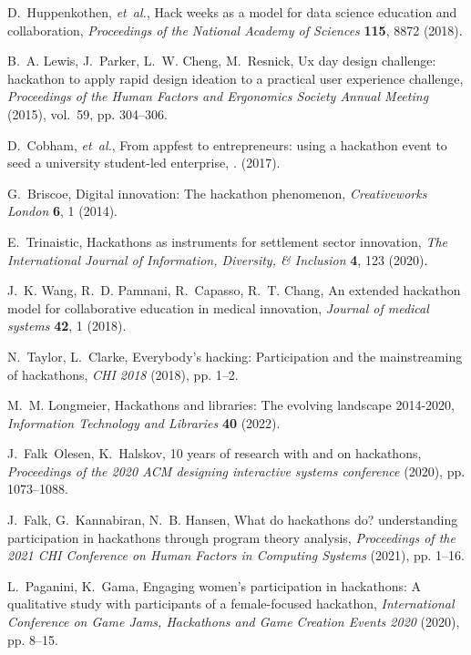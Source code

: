 \documentclass{ieeeaccess}
\begin{document}
\begin{thebibliography}{10}

D.~Huppenkothen, {\it et~al.\/}, Hack weeks as a model for data science
  education and collaboration, {\it Proceedings of the National Academy of
  Sciences\/} {\bf 115}, 8872 (2018).

B.~A. Lewis, J.~Parker, L.~W. Cheng, M.~Resnick, Ux day design challenge:
  hackathon to apply rapid design ideation to a practical user experience
  challenge, {\it Proceedings of the Human Factors and Ergonomics Society
  Annual Meeting\/} (2015), vol.~59, pp. 304--306.

D.~Cobham, {\it et~al.\/}, From appfest to entrepreneurs: using a hackathon
  event to seed a university student-led enterprise, {\it .\/}  (2017).

G.~Briscoe, Digital innovation: The hackathon phenomenon, {\it Creativeworks
  London\/} {\bf 6}, 1 (2014).

E.~Trinaistic, Hackathons as instruments for settlement sector innovation, {\it
  The International Journal of Information, Diversity, \& Inclusion\/} {\bf 4},
  123 (2020).

J.~K. Wang, R.~D. Pamnani, R.~Capasso, R.~T. Chang, An extended hackathon model
  for collaborative education in medical innovation, {\it Journal of medical
  systems\/} {\bf 42}, 1 (2018).

N.~Taylor, L.~Clarke, Everybody’s hacking: Participation and the
  mainstreaming of hackathons, {\it CHI 2018\/} (2018), pp. 1--2.

M.~M. Longmeier, Hackathons and libraries: The evolving landscape 2014-2020,
  {\it Information Technology and Libraries\/} {\bf 40} (2022).

J.~Falk~Olesen, K.~Halskov, 10 years of research with and on hackathons, {\it
  Proceedings of the 2020 ACM designing interactive systems conference\/}
  (2020), pp. 1073--1088.

J.~Falk, G.~Kannabiran, N.~B. Hansen, What do hackathons do? understanding
  participation in hackathons through program theory analysis, {\it Proceedings
  of the 2021 CHI Conference on Human Factors in Computing Systems\/} (2021),
  pp. 1--16.

L.~Paganini, K.~Gama, Engaging women’s participation in hackathons: A
  qualitative study with participants of a female-focused hackathon, {\it
  International Conference on Game Jams, Hackathons and Game Creation Events
  2020\/} (2020), pp. 8--15.


\end{thebibliography}
\end{document}

